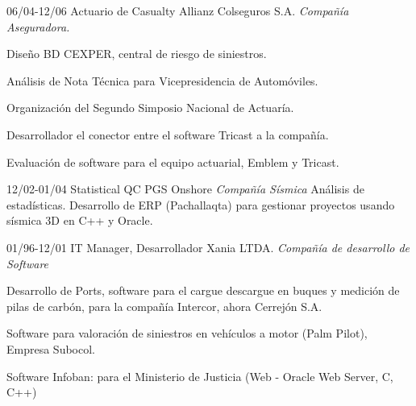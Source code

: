 \begin{entrylist}
  \entry
	{06/04-12/06}
	{Actuario de Casualty}
	{Allianz Colseguros S.A. {\sl Compañía Aseguradora.}}
	{Diseño BD CEXPER, central de riesgo de siniestros.

Análisis de Nota Técnica para Vicepresidencia de Automóviles.

Organización del Segundo Simposio Nacional de Actuaría.

Desarrollador el conector entre el software Tricast a la compañía.

Evaluación de software para el equipo actuarial, Emblem y Tricast.}


  \entry
	{12/02-01/04}
	{Statistical QC}
	{PGS Onshore {\sl Compañía Sísmica}}
	{Análisis de estadísticas. Desarrollo de ERP (Pachallaqta) para gestionar proyectos
	usando sísmica 3D en C++ y Oracle.}

  \entry
	{01/96-12/01}
	{IT Manager, Desarrollador}
	{Xania LTDA. {\sl Compañía de desarrollo de Software}}
	{Desarrollo de Ports, software para el cargue descargue en buques y medición de pilas de carbón,
	para la compañía Intercor, ahora Cerrejón S.A.

Software para valoración de siniestros en vehículos a motor (Palm Pilot), Empresa
Subocol.

Software Infoban: para el Ministerio de Justicia (Web - Oracle Web Server, C,
C++)



}

  \end{entrylist}
